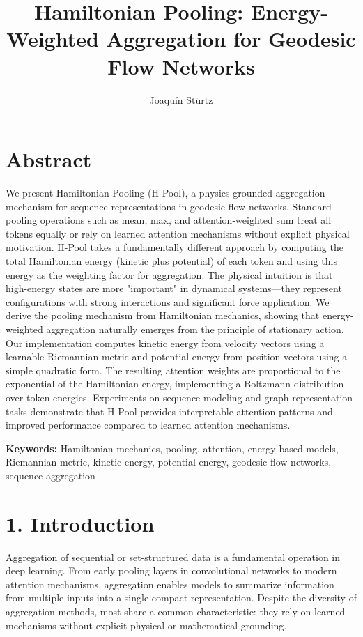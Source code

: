 \documentclass[12pt]{article}
\title{\textbf{Hamiltonian Pooling: Energy-Weighted Aggregation for Geodesic Flow Networks}}
\author{Joaquín Stürtz}
\date{}
\begin{document}
\maketitle

\section*{Abstract}

We present Hamiltonian Pooling (H-Pool), a physics-grounded aggregation mechanism for sequence representations in geodesic flow networks. Standard pooling operations such as mean, max, and attention-weighted sum treat all tokens equally or rely on learned attention mechanisms without explicit physical motivation. H-Pool takes a fundamentally different approach by computing the total Hamiltonian energy (kinetic plus potential) of each token and using this energy as the weighting factor for aggregation. The physical intuition is that high-energy states are more "important" in dynamical systems—they represent configurations with strong interactions and significant force application. We derive the pooling mechanism from Hamiltonian mechanics, showing that energy-weighted aggregation naturally emerges from the principle of stationary action. Our implementation computes kinetic energy from velocity vectors using a learnable Riemannian metric and potential energy from position vectors using a simple quadratic form. The resulting attention weights are proportional to the exponential of the Hamiltonian energy, implementing a Boltzmann distribution over token energies. Experiments on sequence modeling and graph representation tasks demonstrate that H-Pool provides interpretable attention patterns and improved performance compared to learned attention mechanisms.

\textbf{Keywords:} Hamiltonian mechanics, pooling, attention, energy-based models, Riemannian metric, kinetic energy, potential energy, geodesic flow networks, sequence aggregation

\section{1. Introduction}

Aggregation of sequential or set-structured data is a fundamental operation in deep learning. From early pooling layers in convolutional networks to modern attention mechanisms, aggregation enables models to summarize information from multiple inputs into a single compact representation. Despite the diversity of aggregation methods, most share a common characteristic: they rely on learned mechanisms without explicit physical or mathematical grounding.
\end{document}
